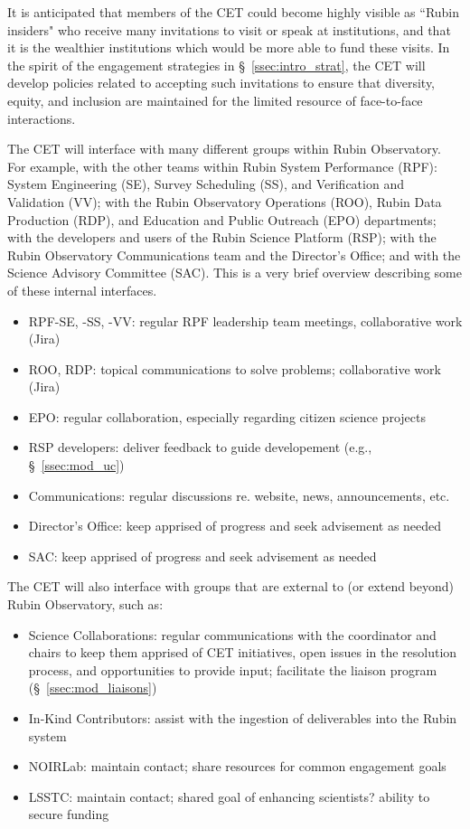 \documentclass[DM,lsstdraft,toc]{lsstdoc}
\begin{document}
It is anticipated that members of the CET could become highly visible as ``Rubin insiders" who receive many invitations to visit or speak at institutions, and that it is the wealthier institutions which would be more able to fund these visits.
In the spirit of the engagement strategies in \S~\ref{ssec:intro_strat}, the CET will develop policies related to accepting such invitations to ensure that diversity, equity, and inclusion are maintained for the limited resource of face-to-face interactions.

The CET will interface with many different groups within Rubin Observatory.
For example, with the other teams within Rubin System Performance (RPF): System Engineering (SE), Survey Scheduling (SS), and Verification and Validation (VV); with the Rubin Observatory Operations (ROO), Rubin Data Production (RDP), and Education and Public Outreach (EPO) departments; with the developers and users of the Rubin Science Platform (RSP); with the Rubin Observatory Communications team and the Director's Office; and with the Science Advisory Committee (SAC). 
This is a very brief overview describing some of these internal interfaces.
\begin{itemize}
\item RPF-SE, -SS, -VV: regular RPF leadership team meetings, collaborative work (Jira)
\item ROO, RDP: topical communications to solve problems; collaborative work (Jira)
\item EPO: regular collaboration, especially regarding citizen science projects
\item RSP developers: deliver feedback to guide developement (e.g., \S~\ref{ssec:mod_uc})
\item Communications: regular discussions re. website, news, announcements, etc.
\item Director's Office: keep apprised of progress and seek advisement as needed
\item SAC: keep apprised of progress and seek advisement as needed
\end{itemize}

The CET will also interface with groups that are external to (or extend beyond) Rubin Observatory, such as:
\begin{itemize}
\item Science Collaborations: regular communications with the coordinator and chairs to keep them apprised of CET initiatives, open issues in the resolution process, and opportunities to provide input; facilitate the liaison program (\S~\ref{ssec:mod_liaisons})
\item In-Kind Contributors: assist with the ingestion of deliverables into the Rubin system
\item NOIRLab: maintain contact; share resources for common engagement goals
\item LSSTC: maintain contact; shared goal of enhancing scientists? ability to secure funding
\end{itemize}
\end{document}

